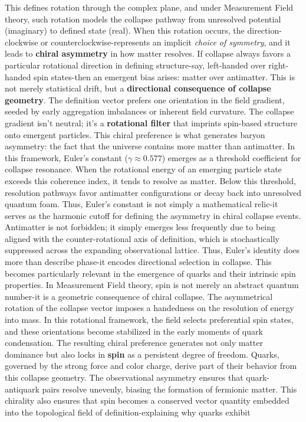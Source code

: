 This defines rotation through the complex plane, and under Measurement Field theory, such rotation models the collapse pathway from unresolved potential (imaginary) to defined state (real). \cite{collapse_foundations} When this rotation occurs, the direction-clockwise or counterclockwise-represents an implicit \textit{choice of symmetry}, and it leads to \textbf{chiral asymmetry} in how matter resolves. If collapse always favors a particular rotational direction in defining structure-say, left-handed over right-handed spin states-then an emergent bias arises: matter over antimatter. \cite{collapse_foundations} This is not merely statistical drift, but a \textbf{directional consequence of collapse geometry}. \cite{collapse_foundations} The definition vector prefers one orientation in the field gradient, seeded by early aggregation imbalances or inherent field curvature. \cite{collapse_foundations} The collapse gradient isn't neutral; it’s a \textbf{rotational filter} that imprints spin-based structure onto emergent particles. \cite{collapse_foundations} This chiral preference is what generates baryon asymmetry: the fact that the universe contains more matter than antimatter. \cite{collapse_foundations} In this framework, Euler’s constant ($\gamma \approx 0.577$) emerges as a threshold coefficient for collapse resonance. \cite{collapse_foundations} When the rotational energy of an emerging particle state exceeds this coherence index, it tends to resolve as matter. \cite{collapse_foundations} Below this threshold, resolution pathways favor antimatter configurations or decay back into unresolved quantum foam. \cite{collapse_foundations} Thus, Euler’s constant is not simply a mathematical relic-it serves as the harmonic cutoff for defining the asymmetry in chiral collapse events. \cite{collapse_foundations} Antimatter is not forbidden; it simply emerges less frequently due to being aligned with the counter-rotational axis of definition, which is stochastically suppressed across the expanding observational lattice. \cite{collapse_foundations} Thus, Euler's identity does more than describe phase-it encodes directional selection in collapse. \cite{collapse_foundations} This becomes particularly relevant in the emergence of quarks and their intrinsic spin properties. In Measurement Field theory, spin is not merely an abstract quantum number-it is a geometric consequence of chiral collapse. \cite{collapse_foundations} The asymmetrical rotation of the collapse vector imposes a handedness on the resolution of energy into mass. \cite{collapse_foundations} In this rotational framework, the field selects preferential spin states, and these orientations become stabilized in the early moments of quark condensation. \cite{collapse_foundations} The resulting chiral preference generates not only matter dominance but also locks in \textbf{spin} as a persistent degree of freedom. Quarks, governed by the strong force and color charge, derive part of their behavior from this collapse geometry. \cite{collapse_foundations} The observational asymmetry ensures that quark-antiquark pairs resolve unevenly, biasing the formation of fermionic matter. This chirality also ensures that spin becomes a conserved vector quantity embedded into the topological field of definition-explaining why quarks exhibit 